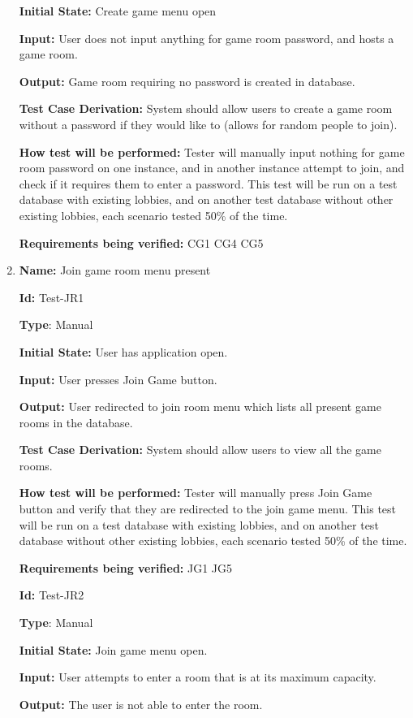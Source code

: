 \documentclass[12pt, titlepage]{article}
\begin{document}
\begin{enumerate}
\textbf{Initial State:} Create game menu open

\textbf{Input:} User does not input anything for game room password, and hosts a game room.

\textbf{Output:} Game room requiring no password is created in database.

\textbf{Test Case Derivation:} System should allow users to create a game room without a password if they would like to (allows for random people to join).

\textbf{How test will be performed:} Tester will manually input nothing for game room password on one instance, and in another instance attempt to join, and check if it requires them to enter a password. This test will be run on a test database with existing lobbies, and on another test database without other existing lobbies, each scenario tested 50\% of the time.

\textbf{Requirements being verified: }CG1 CG4 CG5

\item{\textbf{Name:} Join game room menu present } \label{itm:Test-JR1}

\textbf{Id:} Test-JR1

\textbf{Type}: Manual

\textbf{Initial State:} User has application open.

\textbf{Input:} User presses Join Game button.

\textbf{Output:} User redirected to join room menu which lists all present game rooms in the database.

\textbf{Test Case Derivation:} System should allow users to view all the game rooms.

\textbf{How test will be performed:} Tester will manually press Join Game button and verify that they are redirected to the join game menu. This test will be run on a test database with existing lobbies, and on another test database without other existing lobbies, each scenario tested 50\% of the time.

\textbf{Requirements being verified: }JG1 JG5

\textbf{Id:} Test-JR2

\textbf{Type}: Manual

\textbf{Initial State:} Join game menu open.

\textbf{Input:} User attempts to enter a room that is at its maximum capacity.

\textbf{Output:} The user is not able to enter the room.


\end{enumerate}
\end{document}
